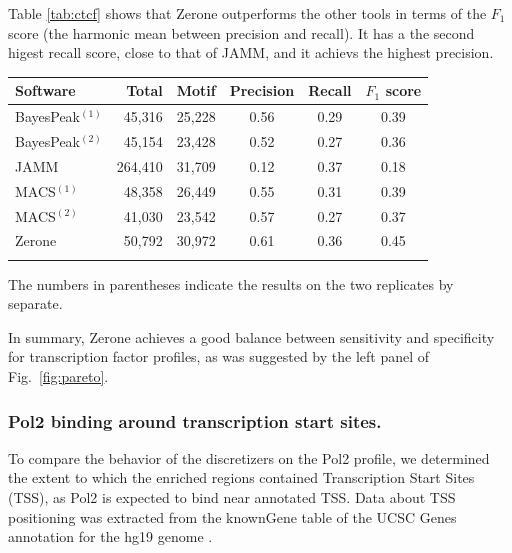 \documentclass{bioinfo}
\begin{document}
Table \ref{tab:ctcf} shows that Zerone outperforms the other tools
in terms of the $F_1$ score (the harmonic mean between precision and
recall). It has a the second higest recall score, close to that of JAMM,
and it achievs the highest precision.

\begin{table}[!t]
{\begin{tabular}{lrrccc}
        \toprule
        \textbf{Software}  & \textbf{Total}  & \textbf{Motif} &
        \textbf{Precision} & \textbf{Recall} & \textbf{$F_{1}$ score} \\
        \midrule
        BayesPeak$^{(1)}$ &  45,316 & 25,228 & 0.56 & 0.29 & 0.39 \\
        BayesPeak$^{(2)}$ &  45,154 & 23,428 & 0.52 & 0.27 & 0.36 \\
        JAMM              & 264,410 & 31,709 & 0.12 & 0.37 & 0.18 \\
        MACS$^{(1)}$      &  48,358 & 26,449 & 0.55 & 0.31 & 0.39 \\
        MACS$^{(2)}$      &  41,030 & 23,542 & 0.57 & 0.27 & 0.37 \\
        Zerone            &  50,792 & 30,972 & 0.61 & 0.36 & 0.45 \\
        \botrule
\end{tabular}}{The numbers in parentheses indicate the results on the two
replicates by separate.}
\end{table}

In summary, Zerone achieves a good balance between sensitivity and
specificity for transcription factor profiles, as was suggested by
the left panel of Fig.~\ref{fig:pareto}.

\subsubsection{Pol2 binding around transcription start sites.}
To compare the behavior of the discretizers on the Pol2 profile,
we determined the extent to which the enriched regions contained Transcription
Start Sites (TSS), as Pol2 is expected to bind near annotated TSS. Data about
TSS positioning was extracted from the knownGene table of the UCSC Genes
annotation for the hg19 genome \citep{Karolchik2004}.
\end{document}
